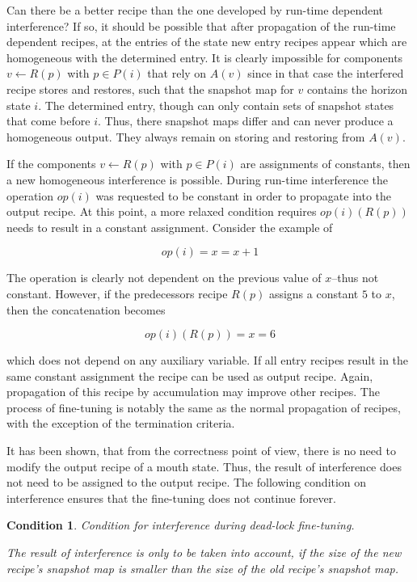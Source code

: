 \documentclass[12pt,a4paper]{scrartcl}
\theoremstyle{break}
\newtheorem{condition}{Condition}
\begin{document}
Can there be a better recipe than the one developed by run-time dependent
interference? If so, it should be possible that after propagation of the
run-time dependent recipes, at the entries of the state new entry recipes
appear which are homogeneous with the determined entry. It is clearly
impossible for components $v \leftarrow R(p)$ with $p \in P(i)$ that rely on
$A(v)$ since in that case the interfered recipe stores and restores, such that
the snapshot map for $v$ contains the horizon state $i$. The determined entry,
though can only contain sets of snapshot states that come before $i$. Thus,
there snapshot maps differ and can never produce a homogeneous output. They
always remain on storing and restoring from $A(v)$.

If the components $v \leftarrow R(p)$ with $p \in P(i)$ are assignments of
constants, then a new homogeneous interference is possible. During run-time
interference the operation $op(i)$ was requested to be constant in order to
propagate into the output recipe. At this point, a more relaxed condition
requires $op(i)(R(p))$ needs to result in a constant assignment. Consider the
example of 

\[
                       op(i) = { x = x + 1 }
\]

The operation is clearly not dependent on the previous value of $x$--thus not
constant. However, if the predecessors recipe $R(p)$ assigns a constant $5$ to
$x$, then the concatenation becomes

\[
                       op(i)(R(p)) = { x = 6 }
\]

which does not depend on any auxiliary variable. If all entry recipes result in
the same constant assignment the recipe can be used as output recipe. Again,
propagation of this recipe by accumulation may improve other recipes. The process
of fine-tuning is notably the same as the normal propagation of recipes, with 
the exception of the termination criteria.

It has been shown, that from the correctness point of view, there is no need to
modify the output recipe of a mouth state. Thus, the result of interference
does not need to be assigned to the output recipe. The following condition 
on interference ensures that the fine-tuning does not continue forever.

\begin{condition}
Condition for interference during dead-lock fine-tuning.

The result of interference is only to be taken into account, if the size of the
new recipe's snapshot map is smaller than the size of the old recipe's snapshot
map.  
\end{condition}
\end{document}
